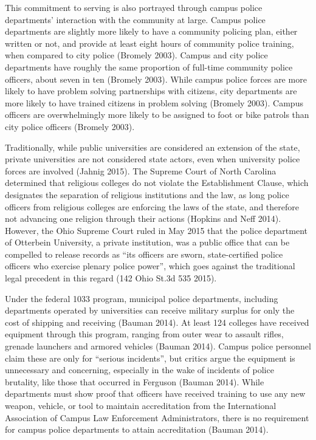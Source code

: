 \documentclass{ucetd}
\begin{document}
This commitment to serving is also portrayed through campus police
departments' interaction with the community at large. Campus police
departments are slightly more likely to have a community policing plan,
either written or not, and provide at least eight hours of community
police training, when compared to city police (Bromely 2003). Campus and
city police departments have roughly the same proportion of full-time
community police officers, about seven in ten (Bromely 2003). While
campus police forces are more likely to have problem solving
partnerships with citizens, city departments are more likely to have
trained citizens in problem solving (Bromely 2003). Campus officers are
overwhelmingly more likely to be assigned to foot or bike patrols than
city police officers (Bromely 2003).

Traditionally, while public universities are considered an extension of
the state, private universities are not considered state actors, even
when university police forces are involved (Jahnig 2015). The Supreme
Court of North Carolina determined that religious colleges do not
violate the Establishment Clause, which designates the separation of
religious institutions and the law, as long police officers from
religious colleges are enforcing the laws of the state, and therefore
not advancing one religion through their actions (Hopkins and Neff
2014). However, the Ohio Supreme Court ruled in May 2015 that the police
department of Otterbein University, a private institution, was a public
office that can be compelled to release records as ``its officers are
sworn, state-certified police officers who exercise plenary police
power'', which goes against the traditional legal precedent in this
regard (142 Ohio St.3d 535 2015).

Under the federal 1033 program, municipal police departments, including
departments operated by universities can receive military surplus for
only the cost of shipping and receiving (Bauman 2014). At least 124
colleges have received equipment through this program, ranging from
outer wear to assault rifles, grenade launchers and armored vehicles
(Bauman 2014). Campus police personnel claim these are only for
``serious incidents'', but critics argue the equipment is unnecessary
and concerning, especially in the wake of incidents of police brutality,
like those that occurred in Ferguson (Bauman 2014). While departments
must show proof that officers have received training to use any new
weapon, vehicle, or tool to maintain accreditation from the
International Association of Campus Law Enforcement Administrators,
there is no requirement for campus police departments to attain
accreditation (Bauman 2014).
\end{document}

